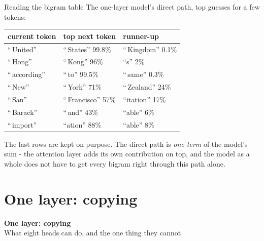 \documentclass[aspectratio=169]{beamer}
\newcommand{\watchbox}[1]{%
  \begin{tcolorbox}[colback=armorange!12, colframe=armorange, boxrule=0.6pt, arc=2pt]
  #1
  \end{tcolorbox}}
\newcommand{\sectiontransition}[2]{%
  \begin{frame}[plain]
    \vfill
    \begin{center}
      {\Huge\bfseries\color{popblue} #1}\\[1.1em]
      {\large #2}
    \end{center}
    \vfill
  \end{frame}}
\begin{document}
\begin{frame}{Reading the bigram table}
  \vspace{0.3em}
  The one-layer model's direct path, top guesses for a few tokens:

  \vspace{0.4em}
  \begin{center}
  \small
  \begin{tabular}{@{}lll@{}}
    \toprule
    \textbf{current token} & \textbf{top next token} & \textbf{runner-up}\\
    \midrule
    ``\,United'' & \textcolor{paramgreen}{``\,States''} 99.8\% & ``\,Kingdom'' 0.1\%\\
    ``\,Hong'' & \textcolor{paramgreen}{``\,Kong''} 96\% & ``s'' 2\%\\
    ``\,according'' & \textcolor{paramgreen}{``\,to''} 99.5\% & ``\,same'' 0.3\%\\
    ``\,New'' & \textcolor{paramgreen}{``\,York''} 71\% & ``\,Zealand'' 24\%\\
    ``\,San'' & \textcolor{paramgreen}{``\,Francisco''} 57\% & ``itation'' 17\%\\
    ``\,Barack'' & \textcolor{armred}{``\,and''} 43\% & ``able'' 6\%\\
    ``\,import'' & \textcolor{armred}{``ation''} 88\% & ``able'' 8\%\\
    \bottomrule
  \end{tabular}
  \end{center}

  \vspace{0.4em}
  \watchbox{\small The last rows are kept on purpose. The direct path is \emph{one term} of the
  model's sum - the attention layer adds its own contribution on top, and the model as a whole
  does not have to get every bigram right through this path alone.}
\end{frame}

\section{One layer: copying}
\sectiontransition{One layer: copying}{What eight heads can do, and the one thing they cannot}
\end{document}
